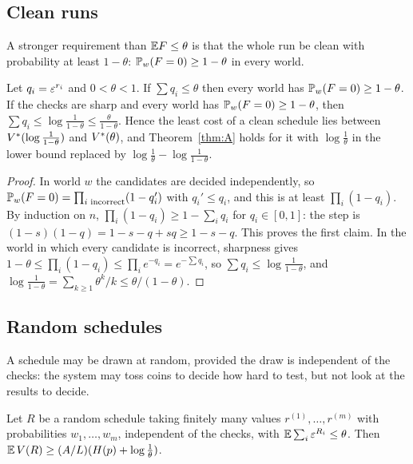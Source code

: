 \subsection{Clean runs}

A stronger requirement than $\mathbb{E} F\le\theta$ is that the whole run be clean with probability at least $1-\theta$: $\mathbb{P}_{w}(F=0)\ge1-\theta$ in every world.

\begin{proposition}\label{prop:clean}
Let $q_{i}=\varepsilon^{r_{i}}$ and $0<\theta<1$. If $\sum q_{i}\le\theta$ then every world has $\mathbb{P}_{w}(F=0)\ge1-\theta$. If the checks are sharp and every world has $\mathbb{P}_{w}(F=0)\ge1-\theta$, then $\sum q_{i}\le\log\frac1{1-\theta}\le\frac{\theta}{1-\theta}$. Hence the least cost of a clean schedule lies between $V^{*}(\log\frac1{1-\theta})$ and $V^{*}(\theta)$, and Theorem~\ref{thm:A} holds for it with $\log\frac1\theta$ in the lower bound replaced by $\log\frac1\theta-\log\frac1{1-\theta}$.
\end{proposition}

\begin{proof}
In world $w$ the candidates are decided independently, so $\mathbb{P}_{w}(F=0)=\prod_{i\text{ incorrect}}(1-q_{i}')$ with $q_{i}'\le q_{i}$, and this is at least $\prod_{i}(1-q_{i})$. By induction on $n$, $\prod_{i}(1-q_{i})\ge1-\sum_{i}q_{i}$ for $q_{i}\in[0,1]$: the step is $(1-s)(1-q)=1-s-q+sq\ge1-s-q$. This proves the first claim. In the world in which every candidate is incorrect, sharpness gives $1-\theta\le\prod_{i}(1-q_{i})\le\prod_{i}e^{-q_{i}}=e^{-\sum q_{i}}$, so $\sum q_{i}\le\log\frac1{1-\theta}$, and $\log\frac1{1-\theta}=\sum_{k\ge1}\theta^{k}/k\le\theta/(1-\theta)$.
\end{proof}

\subsection{Random schedules}

A schedule may be drawn at random, provided the draw is independent of the checks: the system may toss coins to decide how hard to test, but not look at the results to decide.

\begin{proposition}\label{prop:random}
Let $R$ be a random schedule taking finitely many values $r^{(1)},\dots,r^{(m)}$ with probabilities $w_{1},\dots,w_{m}$, independent of the checks, with $\mathbb{E}\sum_{i}\varepsilon^{R_{i}}\le\theta$. Then $\mathbb{E}\,V(R)\ge(A/L)(H(p)+\log\frac1\theta)$.
\end{proposition}

